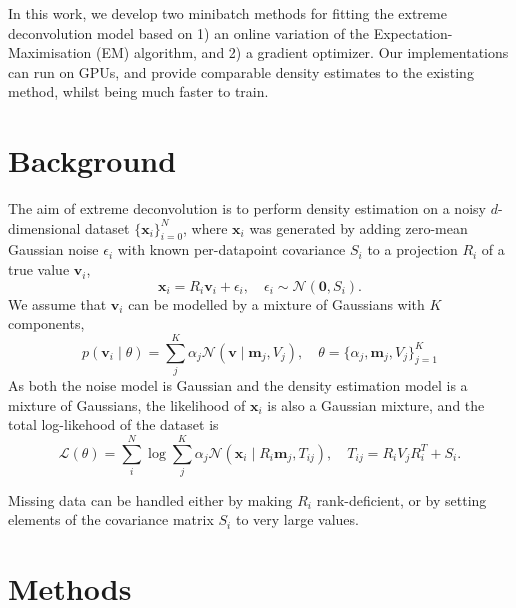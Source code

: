 \documentclass{article}
\newcommand{\bx}{\mathbf{x}}
\newcommand{\bv}{\mathbf{v}}
\newcommand{\bm}{\mathbf{m}}
\begin{document}
In this work, we develop two minibatch methods for fitting the extreme deconvolution model
based on 1) an online variation of the Expectation-Maximisation (EM) algorithm, and 2) a gradient optimizer.
Our implementations can run on GPUs, and provide comparable density estimates to the existing method, whilst being much faster to train.

\section{Background}

The aim of extreme deconvolution is to perform density estimation on a noisy $d$-dimensional dataset $\{\bx_i\}_{i=0}^N$, where $\bx_i$ was generated by adding zero-mean Gaussian noise $\epsilon_i$ with known per-datapoint covariance $S_i$ to a projection $R_i$ of a true value $\bv_i$,
\begin{equation}
  \bx_i = R_i\bv_i + \epsilon_i,\quad  \epsilon_i \sim \mathcal{N}(\mathbf{0}, S_i).
\end{equation}
We assume that $\bv_i$ can be modelled by a mixture of Gaussians with $K$ components,
\begin{equation}
p(\bv_i \mid \theta) = \sum_j^K \alpha_j \mathcal{N}(\bv \mid \bm_j, V_j), \quad \theta = \{\alpha_j, \bm_j, V_j\}_{j=1} ^ K
\end{equation}
As both the noise model is Gaussian and the density estimation model is a mixture of Gaussians, the likelihood of $\bx_i$ is also a Gaussian mixture,
and the total log-likehood of the dataset is
\begin{equation}
\mathcal{L}(\theta) = \sum_i^N \log \sum_j^K \alpha_j\mathcal{N}(\bx_i \mid R_i\bm_j, T_{ij}), \quad T_{ij} = R_iV_jR_i^T + S_i.
\end{equation}

Missing data can be handled either by making $R_i$ rank-deficient, or by setting elements of the covariance matrix $S_i$ to very large values.

\section{Methods}
\end{document}
